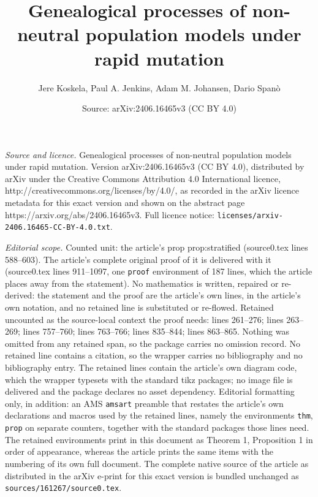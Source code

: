 \documentclass[10pt,a4paper]{amsart}
\title{Genealogical processes of non-neutral population models under rapid mutation}
\author{Jere Koskela, Paul A. Jenkins, Adam M. Johansen, Dario Span\`o}
\date{Source: arXiv:2406.16465v3 (CC BY 4.0)}
\begin{document}
\maketitle

\noindent\emph{Source and licence.} Genealogical processes of non-neutral population models under rapid mutation. Version arXiv:2406.16465v3 (CC BY 4.0), distributed by arXiv under the Creative Commons Attribution 4.0 International licence, http://creativecommons.org/licenses/by/4.0/, as recorded in the arXiv licence metadata for this exact version and shown on the abstract page https://arxiv.org/abs/2406.16465v3. Full licence notice: \texttt{licenses/arxiv-2406.16465-CC-BY-4.0.txt}.\par\smallskip

\noindent\textit{Editorial scope.} Counted unit: the article's prop prop:stratified (source0.tex lines 588--603). The article's complete original proof of it is delivered with it (source0.tex lines 911--1097, one \texttt{proof} environment of 187 lines, which the article places away from the statement). No mathematics is written, repaired or re-derived: the statement and the proof are the article's own lines, in the article's own notation, and no retained line is substituted or re-flowed.  Retained uncounted as the source-local context the proof needs: lines 261--276; lines 263--269; lines 757--760; lines 763--766; lines 835--844; lines 863--865.  Nothing was omitted from any retained span, so the package carries no omission record.  No retained line contains a citation, so the wrapper carries no bibliography and no bibliography entry.  The retained lines contain the article's own diagram code, which the wrapper typesets with the standard tikz packages; no image file is delivered and the package declares no asset dependency.  Editorial formatting only, in addition: an AMS \texttt{amsart} preamble that restates the article's own declarations and macros used by the retained lines, namely the environments \texttt{thm}, \texttt{prop} on separate counters, together with the standard packages those lines need.  The retained environments print in this document as Theorem 1, Proposition 1 in order of appearance, whereas the article prints the same items with the numbering of its own full document.  The complete native source of the article as distributed in the arXiv e-print for this exact version is bundled unchanged as \texttt{sources/161267/source0.tex}.
\end{document}
